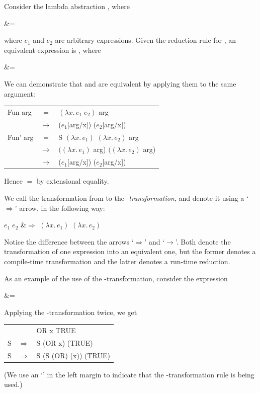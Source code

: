 Consider the lambda abstraction , where
\begin{letalign}
     &= 
\end{letalign}
where $e_1$ and $e_2$ are arbitrary expressions. Given the reduction rule for , an
equivalent expression is , where
\begin{letalign}
     &= 
\end{letalign}
We can demonstrate that  and  are equivalent by applying them to the
same argument:
\begin{mlcoded}
    \begin{tabular}{@{}l@{ }c@{ }l@{}}
        Fun arg & $=$ & $(\lambda x.\,e_1\; e_2)$ arg \\
        & $\rightarrow$ & ($e_1$[arg/x]) ($e_2$[arg/x]) \\[6pt]
        Fun' arg & $=$ & S $(\lambda x.\,e_1)$ $(\lambda x.\,e_2)$ arg \\
        & $\rightarrow$ & $((\lambda x.\,e_1)$ arg) $((\lambda x.\,e_2)$ arg) \\
        & $\rightarrow$ & ($e_1$[arg/x]) ($e_2$[arg/x])
    \end{tabular}
\end{mlcoded}
Hence  $=$  by extensional equality.

We call the transformation from  to  the -\textit{transformation}, and
denote it using a `$\Rightarrow$'
arrow, in the following way:
\begin{letalign}
    $e_1\; e_2$ &$\Rightarrow$  $(\lambda x.\,e_1)$ $(\lambda x.\,e_2)$
\end{letalign}
Notice the difference between the arrows `$\Rightarrow$'
and `$\rightarrow$'. Both denote the
transformation of one expression into an equivalent one, but the former
denotes a compile-time transformation and the latter denotes a run-time
reduction.

As an example of the use of the -transformation, consider the expression
\begin{letalign}
     &= 
\end{letalign}
Applying the -transformation twice, we get
\begin{mlcoded}
    \begin{tabular}{@{}l@{\;\;}c@{\;\;}l@{}}
        & & \tlb{x}OR x TRUE \\
        S & $\Rightarrow$ & S (\tlb{x}OR x) (\tlb{x}TRUE) \\
        S & $\Rightarrow$ & S (S (\tlb{x}OR) (\tlb{x}x)) (\tlb{x}TRUE)
    \end{tabular}
\end{mlcoded}
(We use an `' in the left margin to indicate that the -transformation rule is
being used.)

